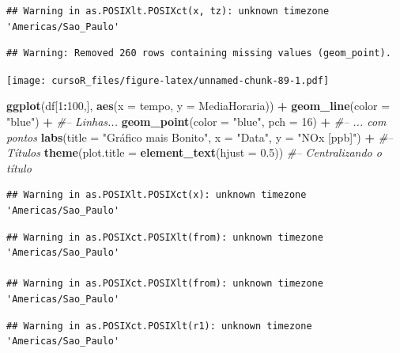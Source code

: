 \documentclass[]{book}
\newenvironment{Shaded}{\begin{snugshade}}{\end{snugshade}}
\newcommand{\KeywordTok}[1]{\textcolor[rgb]{0.13,0.29,0.53}{\textbf{#1}}}
\newcommand{\DataTypeTok}[1]{\textcolor[rgb]{0.13,0.29,0.53}{#1}}
\newcommand{\DecValTok}[1]{\textcolor[rgb]{0.00,0.00,0.81}{#1}}
\newcommand{\FloatTok}[1]{\textcolor[rgb]{0.00,0.00,0.81}{#1}}
\newcommand{\StringTok}[1]{\textcolor[rgb]{0.31,0.60,0.02}{#1}}
\newcommand{\CommentTok}[1]{\textcolor[rgb]{0.56,0.35,0.01}{\textit{#1}}}
\newcommand{\OperatorTok}[1]{\textcolor[rgb]{0.81,0.36,0.00}{\textbf{#1}}}
\newcommand{\NormalTok}[1]{#1}
\theoremstyle{definition}
\theoremstyle{definition}
\theoremstyle{definition}
\theoremstyle{remark}
\begin{document}
\begin{verbatim}
## Warning in as.POSIXlt.POSIXct(x, tz): unknown timezone 'Americas/Sao_Paulo'
\end{verbatim}

\begin{verbatim}
## Warning: Removed 260 rows containing missing values (geom_point).
\end{verbatim}

\texttt{[image: cursoR\_files/figure-latex/unnamed-chunk-89-1.pdf]}

\begin{Shaded}
\begin{Highlighting}[]
\KeywordTok{ggplot}\NormalTok{(df[}\DecValTok{1}\OperatorTok{:}\DecValTok{100}\NormalTok{,], }\KeywordTok{aes}\NormalTok{(}\DataTypeTok{x =}\NormalTok{ tempo, }\DataTypeTok{y =}\NormalTok{ MediaHoraria)) }\OperatorTok{+}\StringTok{ }
\StringTok{  }\KeywordTok{geom_line}\NormalTok{(}\DataTypeTok{color =} \StringTok{"blue"}\NormalTok{) }\OperatorTok{+}\StringTok{ }\CommentTok{#-- Linhas...}
\StringTok{  }\KeywordTok{geom_point}\NormalTok{(}\DataTypeTok{color =} \StringTok{"blue"}\NormalTok{, }\DataTypeTok{pch =} \DecValTok{16}\NormalTok{) }\OperatorTok{+}\StringTok{ }\CommentTok{#-- ... com pontos}
\StringTok{  }\KeywordTok{labs}\NormalTok{(}\DataTypeTok{title =} \StringTok{"Gráfico mais Bonito"}\NormalTok{, }\DataTypeTok{x =} \StringTok{"Data"}\NormalTok{, }\DataTypeTok{y =} \StringTok{"NOx [ppb]"}\NormalTok{) }\OperatorTok{+}\StringTok{ }\CommentTok{#-- Títulos}
\StringTok{  }\KeywordTok{theme}\NormalTok{(}\DataTypeTok{plot.title =} \KeywordTok{element_text}\NormalTok{(}\DataTypeTok{hjust =} \FloatTok{0.5}\NormalTok{)) }\CommentTok{#-- Centralizando o título}
\end{Highlighting}
\end{Shaded}

\begin{verbatim}
## Warning in as.POSIXlt.POSIXct(x): unknown timezone 'Americas/Sao_Paulo'
\end{verbatim}

\begin{verbatim}
## Warning in as.POSIXct.POSIXlt(from): unknown timezone 'Americas/Sao_Paulo'

## Warning in as.POSIXct.POSIXlt(from): unknown timezone 'Americas/Sao_Paulo'
\end{verbatim}

\begin{verbatim}
## Warning in as.POSIXct.POSIXlt(r1): unknown timezone 'Americas/Sao_Paulo'
\end{verbatim}
\end{document}
